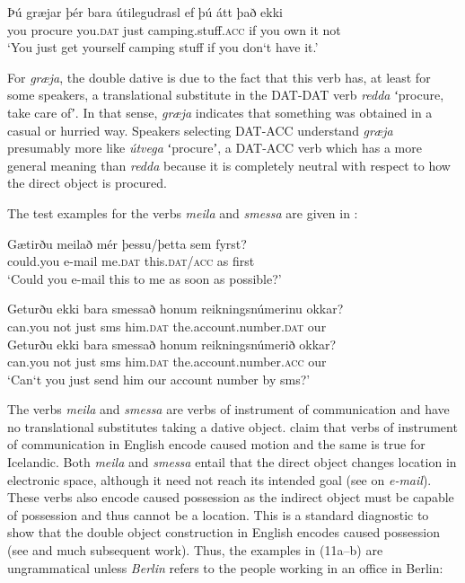 \documentclass[output=paper,modfonts,nonflat,colorlinks,citecolor=brown]{langsci/langscibook}
\begin{document}
\ex
\gll   Þú  græjar  þér  bara  útilegudrasl  ef  þú  átt  það  ekki\\
 you  procure  you.\textsc{dat}  just  camping.stuff.\textsc{acc}  if  you  own  it  not\\
 \glt `You just get yourself camping stuff if you don‘t have it.'
\z
\z

For \textit{græja}, the double dative is due to the fact that this verb has, at least for some speakers, a translational substitute in the DAT-DAT verb \textit{redda} ʻprocure, take care ofʼ. In that sense, \textit{græja} indicates that something was obtained in a casual or hurried way. Speakers selecting DAT-ACC understand \textit{græja} presumably more like \textit{útvega} ʻprocureʼ, a DAT-ACC verb which has a more general meaning than \textit{redda} because it is completely neutral with respect to how the direct object is procured.

The test examples for the verbs \textit{meila} and \textit{smessa} are given in :

\ea%
    \label{ex:jonsson:10}
\ea
\gll  Gætirðu  meilað  mér  þessu/þetta  sem  fyrst?\\
   could.you  e-mail  me.\textsc{dat}  this.\textsc{dat/acc}  as  first\\
\glt `Could you e-mail this to me as soon as possible?'

\ex
\gll   Geturðu  ekki  bara  smessað  honum  reikningsnúmerinu  okkar?\\
 can.you  not  just  sms  him.\textsc{dat}  the.account.number.\textsc{dat}  our\\


\ex
\gll   Geturðu  ekki  bara  smessað  honum  reikningsnúmerið  okkar?\\
 can.you  not  just  sms  him.\textsc{dat}  the.account.number.\textsc{acc}  our\\
\glt `Can‘t you just send him our account number by sms?'
\z
\z

The verbs \textit{meila} and \textit{smessa} are verbs of instrument of communication and have no translational substitutes taking a dative object.  \citet{RappaportHovavLevin2008} claim that verbs of instrument of communication in English encode caused motion and the same is true for Icelandic. Both \textit{meila} and \textit{smessa} entail that the direct object changes location in electronic space, although it need not reach its intended goal (see \citealt{Beavers2011} on \textit{e-mail}). These verbs also encode caused possession as the indirect object must be capable of possession and thus cannot be a location. This is a standard diagnostic to show that the double object construction in English encodes caused possession (see \citealt{Green1974} and much subsequent work). Thus, the examples in (11a--b) are ungrammatical unless \textit{Berlin} refers to the people working in an office in Berlin:
\end{document}
